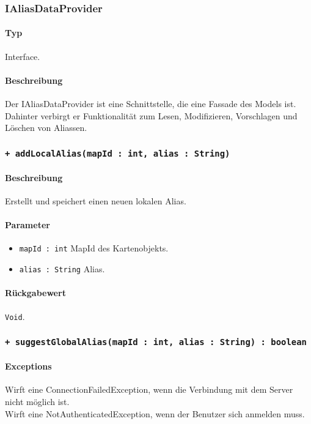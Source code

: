 \subsubsection{IAliasDataProvider}
\paragraph*{Typ}
Interface.
\paragraph*{Beschreibung}
Der IAliasDataProvider ist eine Schnittstelle, die eine Fassade des Models ist. 
Dahinter verbirgt er Funktionalität zum Lesen, Modifizieren, Vorschlagen und Löschen von Aliassen.

\subsubsection*{\texttt{+ addLocalAlias(mapId : int, alias : String)}}%
\paragraph*{Beschreibung}
Erstellt und speichert einen neuen lokalen Alias.
\paragraph*{Parameter}
\begin{itemize}
    \item \texttt{mapId : int} MapId des Kartenobjekts.
    \item \texttt{alias : String} Alias.
\end{itemize}
\paragraph*{Rückgabewert}
\texttt{Void}.

\subsubsection*{\texttt{+ suggestGlobalAlias(mapId : int, alias : String) : boolean}}%
\paragraph*{Exceptions}
Wirft eine ConnectionFailedException, wenn die Verbindung mit dem Server nicht möglich ist.\\
Wirft eine NotAuthenticatedException, wenn der Benutzer sich anmelden muss.
